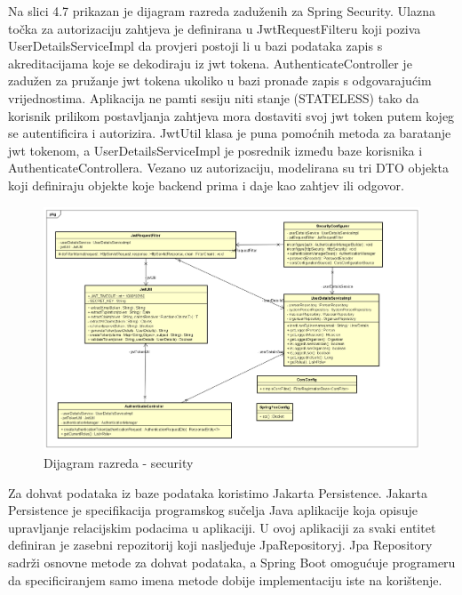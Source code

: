 	Na slici 4.7 prikazan je dijagram razreda zaduženih za Spring Security.
	Ulazna točka za autorizaciju zahtjeva je definirana u JwtRequestFilteru koji poziva UserDetailsServiceImpl da provjeri postoji li u bazi podataka zapis s akreditacijama koje se dekodiraju iz jwt tokena.
	AuthenticateController je zadužen za pružanje jwt tokena ukoliko u bazi pronađe zapis s odgovarajućim vrijednostima.
	Aplikacija ne pamti sesiju niti stanje (STATELESS) tako da korisnik prilikom postavljanja zahtjeva mora dostaviti svoj jwt token putem kojeg se autentificira i autorizira.
	JwtUtil klasa je puna pomoćnih metoda za baratanje jwt tokenom, a UserDetailsServiceImpl je posrednik između baze korisnika i AuthenticateControllera.
	Vezano uz autorizaciju, modelirana su tri DTO objekta koji definiraju objekte koje backend prima i daje kao zahtjev ili odgovor.
	

		\begin{figure}[H]
			\begin{center}
				\includegraphics[width=17cm]{slike/security1.PNG}
			\end{center}
			\caption{Dijagram razreda - security}
			\label{fig:sec}
		\end{figure}
	
	Za dohvat podataka iz baze podataka koristimo Jakarta Persistence. Jakarta Persistence je specifikacija programskog sučelja Java aplikacije koja opisuje upravljanje relacijskim podacima u aplikaciji. U ovoj aplikaciji za svaki entitet definiran je zasebni repozitorij koji nasljeđuje JpaRepositoryj. Jpa Repository sadrži osnovne metode za dohvat podataka, a Spring Boot omogućuje programeru da specificiranjem samo imena metode dobije implementaciju iste na korištenje. 
	
